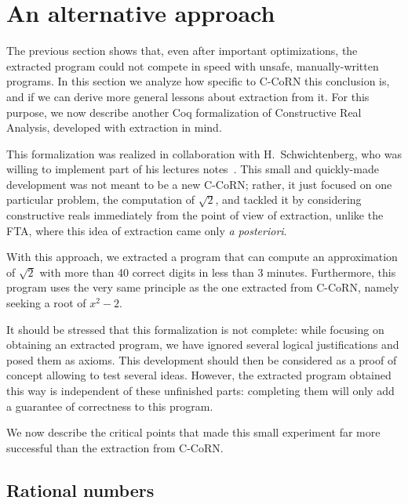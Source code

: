 \documentclass{entcs}
\begin{document}
\section{An alternative approach}\label{fta}

The previous section shows that, even after important optimizations,
the extracted
program could not compete in speed with unsafe, manually-written
programs.  In this section we analyze how specific to C-CoRN this
conclusion is, and if we can derive more general lessons about
extraction from it.  For this purpose, we now describe another Coq
formalization of Constructive Real Analysis, developed with extraction
in mind.



This formalization was realized in
collaboration with H.~Schwichtenberg, who was willing to implement
part of his lectures notes~\cite{sch:03}. This small and quickly-made
development was not meant to be a new C-CoRN; rather, it just focused
on one particular problem, the computation of $\sqrt{2}$, and tackled
it by considering constructive reals immediately from the point of
view of extraction, unlike the FTA, where this idea of extraction came
only \emph{a posteriori}.

With this approach, we extracted a program that 
can compute an approximation of $\sqrt{2}$ with more
than 40 correct digits in less than 3 minutes. 
Furthermore, this program uses the
very same principle as the one extracted from C-CoRN, namely
seeking a root of $x^2-2$.

It should be stressed that this formalization is not complete:
while focusing on obtaining an extracted program, we have ignored
several logical justifications and posed them as axioms. This
development should then be considered as a proof of
concept allowing to test several ideas. However, the
extracted program obtained this way is independent of these
unfinished parts: completing them will only add a
guarantee of correctness to this program.

We now describe the
critical points that made this small experiment far more successful
than the extraction from C-CoRN.

\subsection{Rational numbers}
\end{document}
